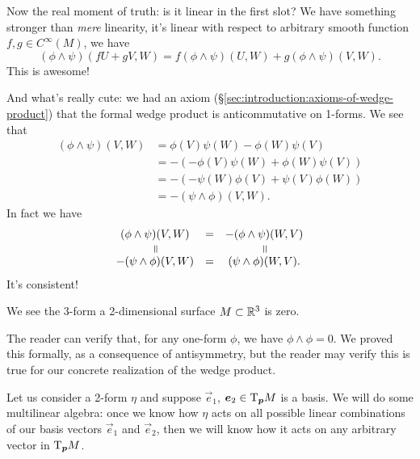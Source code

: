 Now the real moment of truth: is it linear in the
first slot? We have something stronger than \emph{mere} linearity, it's
linear with respect to arbitrary smooth function $f,g\in C^{\infty}(M)$,
we have
\begin{equation}
(\phi\wedge\psi)(fU + gV,W) = f(\phi\wedge\psi)(U,W) + g(\phi\wedge\psi)(V,W).
\end{equation}
This is awesome!

And what's really cute: we had an axiom
(\S\ref{sec:introduction:axioms-of-wedge-product}) that the formal wedge
product is anticommutative on 1-forms. We see that
\begin{subequations}
  \begin{align}
    (\phi\wedge\psi)(V,W)
    &=\phi(V)\psi(W) -\phi(W)\psi(V)\\
    &=-(-\phi(V)\psi(W)+\phi(W)\psi(V))\\
    &=-(-\psi(W)\phi(V)+\psi(V)\phi(W))\\
    &=-(\psi\wedge\phi)(V,W).
  \end{align}
\end{subequations}
In fact we have
\begin{equation}
\begin{array}{ccc}
(\phi\wedge\psi)(V,W) &=& -(\phi\wedge\psi)(W,V)\\
\rotatebox[origin=c]{-90}{$=$} & & \rotatebox[origin=c]{-90}{$=$}\\
-(\psi\wedge\phi)(V,W) &=& (\psi\wedge\phi)(W,V).
\end{array}
\end{equation}
It's consistent!

\begin{remark}
We see the 3-form a 2-dimensional surface $M\subset\mathbb{R}^{3}$ is zero.
\end{remark}

The reader can verify that, for any one-form $\phi$, we have
$\phi\wedge\phi=0$. We proved this formally, as a consequence of
antisymmetry, but the reader may verify this is true for our concrete
realization of the wedge product.

Let us consider a 2-form $\eta$ and suppose $\vec{e}_{1}$,
$\boldsymbol{e}_{2}\in\mathrm{T}_{\boldsymbol{p}}M$ is a basis. We will do some multilinear
algebra: once we know how $\eta$ acts on all possible linear
combinations of our basis vectors $\vec{e}_{1}$ and $\vec{e}_{2}$,
then we will know how it acts on any arbitrary vector in $\mathrm{T}_{\boldsymbol{p}}M$.


